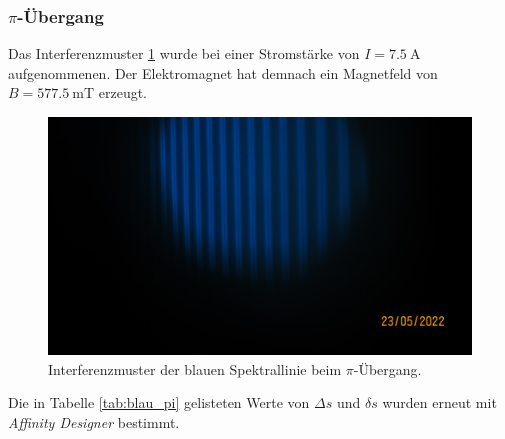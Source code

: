 \subsubsection[]{$\pi$-Übergang}
\label{sec:pi}
Das Interferenzmuster \ref{fig:blau_pi} wurde bei einer Stromstärke von $I=\SI{7.5}{\ampere}$ aufgenommenen. 
Der Elektromagnet hat demnach ein Magnetfeld von $B=\SI{577.5}{\milli\tesla}$ erzeugt. 
\begin{figure}[H]
    \centering
    \includegraphics[scale= 0.2]{Messung/Blau_Pi[5].JPG}
    \caption{Interferenzmuster der blauen Spektrallinie beim $\pi$-Übergang.}
    \label{fig:blau_pi}
\end{figure}
\noindent
Die in Tabelle \ref{tab:blau_pi} gelisteten Werte von $\Delta s$ und $\delta s$ wurden erneut mit \textit{Affinity Designer} \cite{affinity}
bestimmt.

